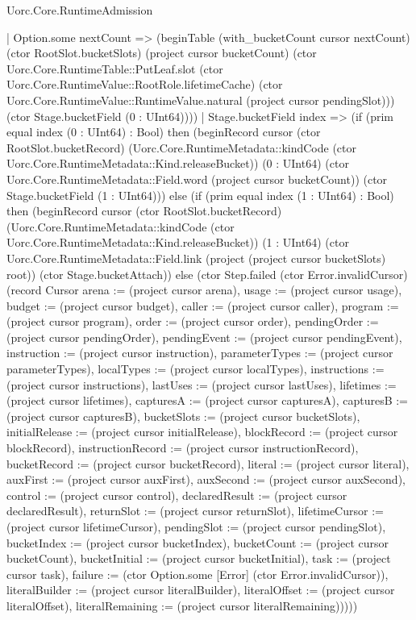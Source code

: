 \begin{lexlean}{Uorc.Core.RuntimeAdmission}
\begin{semanticmodule}
{        | Option.some nextCount => (beginTable (with_bucketCount cursor nextCount) (ctor RootSlot.bucketSlots) (project cursor bucketCount) (ctor Uorc.Core.RuntimeTable::PutLeaf.slot (ctor Uorc.Core.RuntimeValue::RootRole.lifetimeCache) (ctor Uorc.Core.RuntimeValue::RuntimeValue.natural (project cursor pendingSlot))) (ctor Stage.bucketField (0 : UInt64))))
      | Stage.bucketField index => (if (prim equal index (0 : UInt64) : Bool) then (beginRecord cursor (ctor RootSlot.bucketRecord) (Uorc.Core.RuntimeMetadata::kindCode (ctor Uorc.Core.RuntimeMetadata::Kind.releaseBucket)) (0 : UInt64) (ctor Uorc.Core.RuntimeMetadata::Field.word (project cursor bucketCount)) (ctor Stage.bucketField (1 : UInt64))) else (if (prim equal index (1 : UInt64) : Bool) then (beginRecord cursor (ctor RootSlot.bucketRecord) (Uorc.Core.RuntimeMetadata::kindCode (ctor Uorc.Core.RuntimeMetadata::Kind.releaseBucket)) (1 : UInt64) (ctor Uorc.Core.RuntimeMetadata::Field.link (project (project cursor bucketSlots) root)) (ctor Stage.bucketAttach)) else (ctor Step.failed (ctor Error.invalidCursor) (record Cursor {arena := (project cursor arena), usage := (project cursor usage), budget := (project cursor budget), caller := (project cursor caller), program := (project cursor program), order := (project cursor order), pendingOrder := (project cursor pendingOrder), pendingEvent := (project cursor pendingEvent), instruction := (project cursor instruction), parameterTypes := (project cursor parameterTypes), localTypes := (project cursor localTypes), instructions := (project cursor instructions), lastUses := (project cursor lastUses), lifetimes := (project cursor lifetimes), capturesA := (project cursor capturesA), capturesB := (project cursor capturesB), bucketSlots := (project cursor bucketSlots), initialRelease := (project cursor initialRelease), blockRecord := (project cursor blockRecord), instructionRecord := (project cursor instructionRecord), bucketRecord := (project cursor bucketRecord), literal := (project cursor literal), auxFirst := (project cursor auxFirst), auxSecond := (project cursor auxSecond), control := (project cursor control), declaredResult := (project cursor declaredResult), returnSlot := (project cursor returnSlot), lifetimeCursor := (project cursor lifetimeCursor), pendingSlot := (project cursor pendingSlot), bucketIndex := (project cursor bucketIndex), bucketCount := (project cursor bucketCount), bucketInitial := (project cursor bucketInitial), task := (project cursor task), failure := (ctor Option.some [Error] (ctor Error.invalidCursor)), literalBuilder := (project cursor literalBuilder), literalOffset := (project cursor literalOffset), literalRemaining := (project cursor literalRemaining)}))))
}
\end{semanticmodule}
\end{lexlean}
